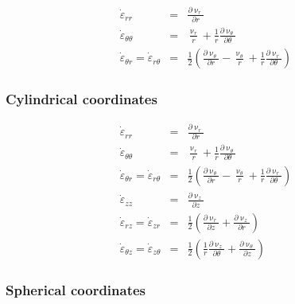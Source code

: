\begin{eqnarray}
\dot\varepsilon_{rr} 
&=& \frac{\partial \upnu_r}{\partial r} \\
\dot\varepsilon_{\theta\theta} 
&=& \frac{\upnu_r}{r} + \frac{1}{r} \frac{\partial \upnu_\theta}{\partial \theta}  \\
\dot\varepsilon_{\theta r} = \dot\varepsilon_{r\theta} 
&=& \frac{1}{2} \left(   \frac{\partial \upnu_\theta}{\partial r} - \frac{\upnu_\theta}{r} 
+\frac{1}{r} \frac{\partial \upnu_r}{\partial \theta}  \right) 
\end{eqnarray}



\subsubsection{Cylindrical coordinates \label{ss:srcc}}

\begin{eqnarray}
\dot\varepsilon_{rr} 
&=& \frac{\partial \upnu_r}{\partial r} 
\\
\dot\varepsilon_{\theta\theta} 
&=& \frac{\upnu_r}{r} + \frac{1}{r} \frac{\partial \upnu_\theta}{\partial \theta}  
\\
\dot\varepsilon_{\theta r} = \dot\varepsilon_{r\theta} 
&=& \frac{1}{2} \left(   \frac{\partial \upnu_\theta}{\partial r} - \frac{\upnu_\theta}{r} 
+\frac{1}{r} \frac{\partial \upnu_r}{\partial \theta}  \right)
\\
\dot\varepsilon_{zz} 
&=& \frac{\partial \upnu_z}{\partial z} 
\\
\dot{\varepsilon}_{rz} = \dot{\varepsilon}_{zr} 
&=& \frac{1}{2}\left( \frac{\partial \upnu_r}{\partial z} + \frac{\partial \upnu_z}{\partial r}  \right) 
\\
\dot{\varepsilon}_{\theta z} = \dot{\varepsilon}_{z \theta} &=& \frac{1}{2}\left( 
\frac{1}{r} \frac{\partial \upnu_z}{\partial \theta} + \frac{\partial \upnu_\theta}{\partial z}  \right) 
\end{eqnarray}

\subsubsection{Spherical coordinates \label{ss:srsc}}


